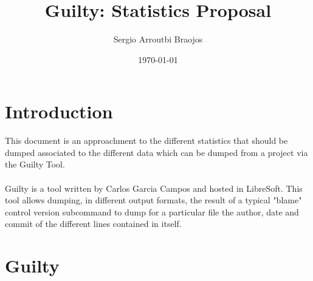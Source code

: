 \documentclass[11pt]{article}
\title{\textbf{Guilty: Statistics Proposal}}
\author{Sergio Arroutbi Braojos}
\date{\today}
\begin{document}
\maketitle

\section{Introduction}

This document is an approachment to the different statistics that should be dumped associated to the different data which can be dumped from a project via the Guilty Tool.\\
\\
Guilty is a tool written by Carlos Garcia Campos and hosted in LibreSoft. This tool allows dumping, in different output formats, the result of a typical "blame" control version subcommand to dump for a particular file the author, date and commit of the different lines contained in itself.\\

\section{Guilty}
\end{document}
